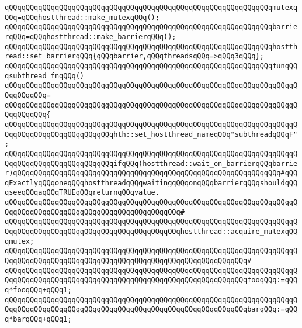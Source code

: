 \newline
\verb|qQQqqQQqqQQqqQQqqQQqqQQqqQQqqQQqqQQqqQQqqQQqqQQqqQQqqQQqqQQqqQQqmutexqQQq=qQQqhostthread::make_mutexqQQq();|\newline
\newline
\verb|qQQqqQQqqQQqqQQqqQQqqQQqqQQqqQQqqQQqqQQqqQQqqQQqqQQqqQQqqQQqqQQqbarrierqQQq=qQQqhostthread::make_barrierqQQq();|\newline
\verb|qQQqqQQqqQQqqQQqqQQqqQQqqQQqqQQqqQQqqQQqqQQqqQQqqQQqqQQqqQQqqQQqhostthread::set_barrierqQQq{qQQqbarrier,qQQqthreadsqQQq=>qQQq3qQQq};|\newline
\newline
\verb|qQQqqQQqqQQqqQQqqQQqqQQqqQQqqQQqqQQqqQQqqQQqqQQqqQQqqQQqqQQqqQQqfunqQQqsubthread_fnqQQq()|\newline
\verb|qQQqqQQqqQQqqQQqqQQqqQQqqQQqqQQqqQQqqQQqqQQqqQQqqQQqqQQqqQQqqQQqqQQqqQQqqQQqqQQq=|\newline
\verb|qQQqqQQqqQQqqQQqqQQqqQQqqQQqqQQqqQQqqQQqqQQqqQQqqQQqqQQqqQQqqQQqqQQqqQQqqQQqqQQq{|\newline
\verb|qQQqqQQqqQQqqQQqqQQqqQQqqQQqqQQqqQQqqQQqqQQqqQQqqQQqqQQqqQQqqQQqqQQqqQQqqQQqqQQqqQQqqQQqqQQqqQQqhth::set_hostthread_nameqQQq"subthreadqQQqF";|\newline
\newline
\verb|qQQqqQQqqQQqqQQqqQQqqQQqqQQqqQQqqQQqqQQqqQQqqQQqqQQqqQQqqQQqqQQqqQQqqQQqqQQqqQQqqQQqqQQqqQQqqQQqifqQQq(hostthread::wait_on_barrierqQQqbarrier)qQQqqQQqqQQqqQQqqQQqqQQqqQQqqQQqqQQqqQQqqQQqqQQqqQQqqQQqqQQqqQQq#qQQqExactlyqQQqoneqQQqhostthreadqQQqwaitingqQQqonqQQqbarrierqQQqshouldqQQqseeqQQqaqQQqTRUEqQQqreturnqQQqvalue.|\newline
\verb|qQQqqQQqqQQqqQQqqQQqqQQqqQQqqQQqqQQqqQQqqQQqqQQqqQQqqQQqqQQqqQQqqQQqqQQqqQQqqQQqqQQqqQQqqQQqqQQqqQQqqQQqqQQqqQQq#|\newline
\verb|qQQqqQQqqQQqqQQqqQQqqQQqqQQqqQQqqQQqqQQqqQQqqQQqqQQqqQQqqQQqqQQqqQQqqQQqqQQqqQQqqQQqqQQqqQQqqQQqqQQqqQQqqQQqqQQqhostthread::acquire_mutexqQQqmutex;|\newline
\verb|qQQqqQQqqQQqqQQqqQQqqQQqqQQqqQQqqQQqqQQqqQQqqQQqqQQqqQQqqQQqqQQqqQQqqQQqqQQqqQQqqQQqqQQqqQQqqQQqqQQqqQQqqQQqqQQqqQQqqQQqqQQqqQQq#|\newline
\verb|qQQqqQQqqQQqqQQqqQQqqQQqqQQqqQQqqQQqqQQqqQQqqQQqqQQqqQQqqQQqqQQqqQQqqQQqqQQqqQQqqQQqqQQqqQQqqQQqqQQqqQQqqQQqqQQqqQQqqQQqqQQqqQQqfooqQQq:=qQQq*fooqQQq+qQQq1;|\newline
\verb|qQQqqQQqqQQqqQQqqQQqqQQqqQQqqQQqqQQqqQQqqQQqqQQqqQQqqQQqqQQqqQQqqQQqqQQqqQQqqQQqqQQqqQQqqQQqqQQqqQQqqQQqqQQqqQQqqQQqqQQqqQQqqQQqbarqQQq:=qQQq*barqQQq+qQQq1;|\newline
